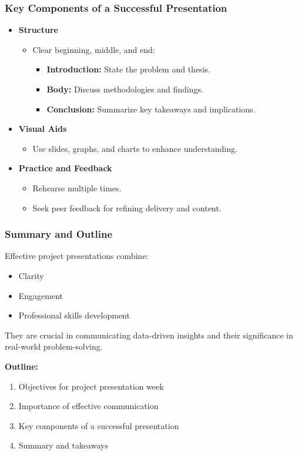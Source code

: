 \documentclass[aspectratio=169]{beamer}
\begin{document}
\begin{frame}[fragile]
    \frametitle{Key Components of a Successful Presentation}
    \begin{itemize}
        \item \textbf{Structure}
        \begin{itemize}
            \item Clear beginning, middle, and end:
            \begin{itemize}
                \item \textbf{Introduction:} State the problem and thesis.
                \item \textbf{Body:} Discuss methodologies and findings.
                \item \textbf{Conclusion:} Summarize key takeaways and implications.
            \end{itemize}
        \end{itemize}

        \item \textbf{Visual Aids}
        \begin{itemize}
            \item Use slides, graphs, and charts to enhance understanding.
        \end{itemize}

        \item \textbf{Practice and Feedback}
        \begin{itemize}
            \item Rehearse multiple times.
            \item Seek peer feedback for refining delivery and content.
        \end{itemize}
    \end{itemize}
\end{frame}

\begin{frame}[fragile]
    \frametitle{Summary and Outline}
    Effective project presentations combine:
    \begin{itemize}
        \item Clarity
        \item Engagement 
        \item Professional skills development
    \end{itemize}
    
    They are crucial in communicating data-driven insights and their significance in real-world problem-solving. 

    \textbf{Outline:}
    \begin{enumerate}
        \item Objectives for project presentation week
        \item Importance of effective communication
        \item Key components of a successful presentation
        \item Summary and takeaways
    \end{enumerate}
\end{frame}
\end{document}
